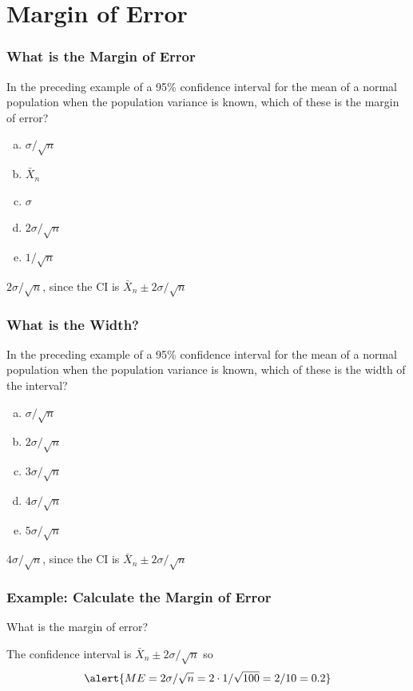 \documentclass{beamer}
\begin{document}
\section{Margin of Error}
\begin{frame}
\frametitle{What is the Margin of Error}
In the preceding example of a  95\% confidence interval for the mean of a normal population when the population variance is known, which of these is the margin of error?
	\begin{enumerate}[(a)]
		\item $\sigma/\sqrt{n}$
		\item $\bar{X}_n$
		\item $\sigma$
		\item $2\sigma/\sqrt{n}$
		\item $1/\sqrt{n}$
	\end{enumerate}
\pause
\vspace{1em}
\alert{\large $2\sigma/\sqrt{n}$, since the CI is $\bar{X}_n \pm 2\sigma/\sqrt{n}$}
\end{frame}

\begin{frame}
\frametitle{What is the Width?}
In the preceding example of a  95\% confidence interval for the mean of a normal population when the population variance is known, which of these is the width of the interval?
	\begin{enumerate}[(a)]
		\item $\sigma/\sqrt{n}$
		\item $2\sigma/\sqrt{n}$
		\item $3\sigma/\sqrt{n}$
		\item $4\sigma/\sqrt{n}$
		\item $5\sigma/\sqrt{n}$
	\end{enumerate}
\pause
\vspace{1em}
\alert{\large $4\sigma/\sqrt{n}$, since the CI is $\bar{X}_n \pm 2\sigma/\sqrt{n}$}
\end{frame}
\begin{frame}
\frametitle{Example: Calculate the Margin of Error }
\begin{center}
\end{center}
What is the margin of error?
\pause

\vspace{2em}

The confidence interval is $\bar{X}_n \pm 2\sigma/\sqrt{n}$ so 
	$$\alert{ME = 2\sigma/\sqrt{n} = 2 \cdot 1/\sqrt{100} = 2/10 = 0.2}$$

\end{frame}
\end{document}

